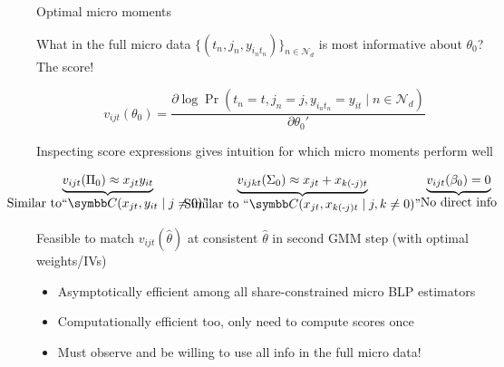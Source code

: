 \documentclass[aspectratio=169,10pt]{beamer}
\begin{document}
\begin{frame}[label=optimal]{Optimal micro moments}
    \begin{wideitemize}
        \item What in the full micro data $\{(t_n, j_n, y_{i_nt_n})\}_{n \in \mathcal{N}_d}$ is \alert{most informative} about $\theta_0$? The \alert{score}!
    \end{wideitemize}
    \begin{equation*}
        v_{ijt}(\theta_0) = \frac{\partial\log\Pr(t_n = t, j_n = j, y_{i_nt_n} = y_{it} \mid n \in \mathcal{N}_d)}{\partial\theta_0'}
    \end{equation*}
    
    \begin{wideitemize}
        \item Inspecting score expressions \alert{gives intuition} for which micro moments perform well
    \end{wideitemize}
    \begin{equation*}
        \hspace{2em}\underbrace{v_{ijt}(\Pi_0) \approx x_{jt} y_{it}}_{\mathclap{\textstyle\text{Similar to``$\Cov(x_{jt}, y_{it} \mid j \neq 0)$''}}} \hspace{6.5em} \underbrace{v_{ijkt}(\Sigma_0) \approx x_{jt} + x_{k(\text{-}j)t}}_{\mathclap{\textstyle\text{Similar to ``$\Cov(x_{jt}, x_{k(\text{-}j)t} \mid j, k \neq 0)$''}}} \hspace{4.5em} \underbrace{v_{ijt}(\beta_0) = 0}_{\mathclap{\textstyle\text{No direct info}}}
    \end{equation*}
    
    \begin{wideitemize}
        \item Feasible to match $v_{ijt}(\hat{\theta})$ at consistent $\hat{\theta}$ in second GMM step (with optimal weights/IVs)
        \begin{itemize}
            \item \alert{Asymptotically efficient} among all \alert{share-constrained} micro BLP estimators
            \item \alert{Computationally efficient} too, only need to compute scores once
            \item Must observe and be willing to use all info in the full micro data!
        \end{itemize}
    \end{wideitemize}
\end{frame}
\end{document}
